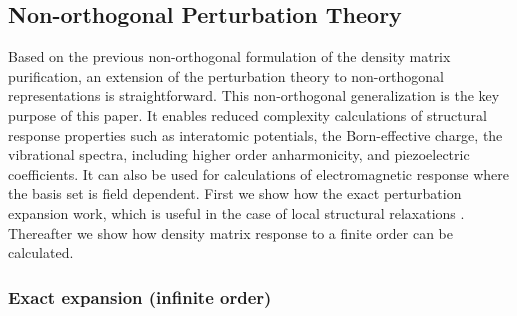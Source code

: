 \documentclass[twocolumn,showpacs,preprintnumbers,amsmath,amssymb]{revtex4}
\begin{document}
\subsection{Non-orthogonal Perturbation Theory}\label{NOPRT}

Based on the previous non-orthogonal formulation of the density matrix purification,
an extension of the perturbation theory to non-orthogonal representations is straightforward.
This non-orthogonal generalization is the key purpose of this paper. It enables reduced complexity
calculations of structural response properties such as interatomic potentials, the Born-effective
charge, the vibrational spectra, including higher order anharmonicity, and piezoelectric
coefficients. It can also be used for calculations of electromagnetic response where
the basis set is field dependent. First we show how the exact perturbation expansion work, which is useful
in the case of local structural relaxations \cite{NiklassonPRT1}. Thereafter we show how 
density matrix response to a finite order can be calculated.

\subsubsection{Exact expansion (infinite order)}
\end{document}

